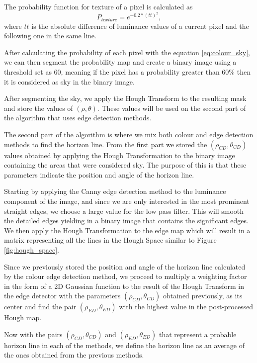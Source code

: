The probability function for texture of a pixel is calculated as
\begin{equation}
	P_{texture} = e^{-0.2*(tt)^{2}},
\end{equation}
where $tt$ is the absolute difference of luminance values of a current pixel and the following one in the same line.

After calculating the probability of each pixel with the equation \ref{eq:colour_sky}, we can then segment the probability map and create a binary image using a threshold set as 60, meaning if the pixel has a probability greater than 60\% then it is considered as sky in the binary image.

After segmenting the sky, we apply the Hough Transform to the resulting mask and store the values of $(\rho,\theta)$. These values will be used on the second part of the algorithm that uses edge detection methods.

The second part of the algorithm is where we mix both colour and edge detection methods to find the horizon line. From the first part we stored the $(\rho_{CD},\theta_{CD})$ values obtained by applying the Hough Transformation to the binary image containing the areas that were considered sky. The purpose of this is that these parameters indicate the position and angle of the horizon line.

Starting by applying the Canny edge detection method to the luminance component of the image, and since we are only interested in the most prominent straight edges, we choose a large value for the low pass filter. This will smooth the detailed edges yielding in a binary image that contains the significant edges. We then apply the Hough Transformation to the edge map which will result in a matrix representing all the lines in the Hough Space similar to Figure \ref{fig:hough_space}.

Since we previously stored the position and angle of the horizon line calculated by the colour edge detection method, we proceed to multiply a weighting factor in the form of a 2D Gaussian function to the result of the Hough Transform in the edge detector with the parameters $(\rho_{CD},\theta_{CD})$ obtained previously, as its center and find the pair $(\rho_{ED}, \theta_{ED})$ with the highest value in the post-processed Hough map.

Now with the pairs $(\rho_{CD}, \theta_{CD})$ and $(\rho_{ED}, \theta_{ED})$ that represent a probable horizon line in each of the methods, we define the horizon line as an average of the ones obtained from the previous methods.

